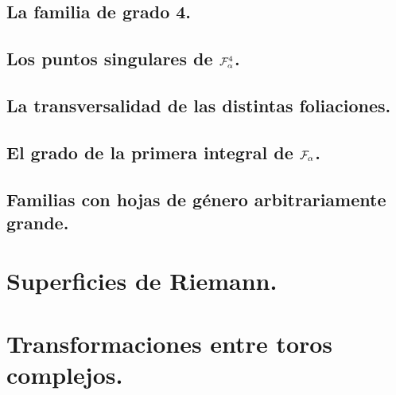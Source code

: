\documentclass[10pt]{book}
\theoremstyle{definition}
\begin{document}
     	    

	\section{La familia de grado 4.}

     	    

  	\section{Los puntos singulares de $\Fol[4]{\alpha}$.}

     	       
     	    
     	    

        \section{La transversalidad de las distintas foliaciones.}

            
        \section{El grado de la primera integral de $\Foli_{\alpha}$.}    
                

        \section{Familias con hojas de género arbitrariamente grande.}
        
\appendix
\chapter{Superficies de Riemann.}
\label{ApendiceSuperficesDeRiemann}

\chapter{Transformaciones entre toros complejos.}
\label{ApendiceToros}        
            
            

\end{document}
